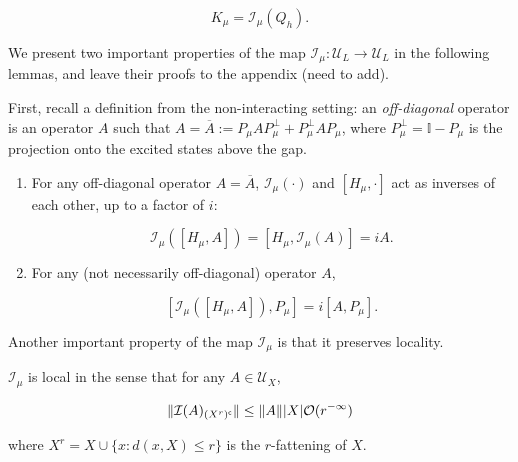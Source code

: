\documentclass[12pt, letterpaper]{article}
\begin{document}
\[K_\mu = \mathcal{I}_\mu(Q_h).\]


We present two important properties of the map $\mathcal{I}_\mu:\mathcal{U}_L\to\mathcal{U}_L$ in the following lemmas, and leave their proofs to the appendix (need to add). 

First, recall a definition from the non-interacting setting: an \emph{off-diagonal} operator is an operator $A$ such that $A = \overline{A} := P_\mu AP_\mu^\perp + P_\mu^\perp AP_\mu$, where $P_\mu^\perp = \mathbb{I} - P_\mu$ is the projection onto the excited states above the gap.

\begin{lemma}
\begin{enumerate}
\item For any off-diagonal operator $A=\overline{A}$, $\mathcal{I}_\mu(\cdot)$ and $[H_\mu, \cdot]$ act as inverses of each other, up to a factor of $i$:

\[\mathcal{I}_\mu\left([H_\mu, A]\right) = [H_\mu, \mathcal{I}_\mu(A)] = iA.\]

\item For any (not necessarily off-diagonal) operator $A$, 

\[[\mathcal{I}_\mu([H_\mu, A]),P_\mu] = i[A,P_\mu].\]
\end{enumerate}
\label{lemma:inverseofH}
\end{lemma}





Another important property of the map $\mathcal{I}_\mu$ is that it preserves locality.

\begin{lemma}
$\mathcal{I}_\mu$ is local in the sense that for any $A \in \mathcal{U}_X$, 

\[\lVert \mathcal{I}(A)_{(X^r)^\mathsf{c}} \rVert \leq \lVert A \rVert |X| \mathcal{O}(r^{-\infty})\]

where $X^r = X \cup \{ x : d(x,X) \leq r\}$ is the $r$-fattening of $X$.
\label{lemma:local}
\end{lemma}
\end{document}
